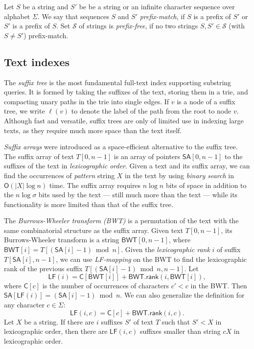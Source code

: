\documentclass[a4paper,UKenglish]{lipics-v2016}
\newcommand{\abs}[1]{\ensuremath{\lvert #1 \rvert}}
\newcommand{\Oh}[1]{\ensuremath{\mathsf{O}\!\left( #1 \right)}}
\newcommand{\rank}{\ensuremath{\mathsf{rank}}}
\newcommand{\LF}{\ensuremath{\mathsf{LF}}}
\newcommand{\LFmapping}{LF\nobreakdash-mapping}
\newcommand{\SA}{\ensuremath{\mathsf{SA}}}
\newcommand{\BWT}{\ensuremath{\mathsf{BWT}}}
\newcommand{\Carray}{\ensuremath{\mathsf{C}}}
\begin{document}
Let $S$ be a string and $S'$ be be a string or an infinite character sequence over alphabet $\Sigma$. We say that sequences $S$ and $S'$ \emph{prefix-match}, if $S$ is a prefix of $S'$ or $S'$ is a prefix of $S$. Set $\mathcal{S}$ of strings is \emph{prefix-free}, if no two strings $S, S' \in \mathcal{S}$ (with $S \ne S'$) prefix-match.

\subsection{Text indexes}

The \emph{suffix tree} \cite{Weiner1973} is the most fundamental full-text index supporting substring queries. It is formed by taking the suffixes of the text, storing them in a trie, and compacting unary paths in the trie into single edges. If $v$ is a node of a suffix tree, we write $\ell(v)$ to denote the label of the path from the root to node $v$. Although fast and versatile, suffix trees are only of limited use in indexing large texts, as they require much more space than the text itself.

\emph{Suffix arrays} \cite{Manber1993} were introduced as a space-efficient alternative to the suffix tree. The suffix array of text $T[0, n-1]$ is an array of pointers $\SA[0, n-1]$ to the suffixes of the text in \emph{lexicographic order}. Given a text and its suffix array, we can find the occurrences of \emph{pattern} string $X$ in the text by using \emph{binary search} in $\Oh{\abs{X} \log n}$ time. The suffix array requires $n \log n$ bits of space in addition to the $n \log \sigma$ bits used by the text --- still much more than the text --- while its functionality is more limited than that of the suffix tree.

The \emph{Burrows-Wheeler transform (BWT)} \cite{Burrows1994} is a permutation of the text with the same combinatorial structure as the suffix array. Given text $T[0, n-1]$, its Burrows-Wheeler transform is a string $\BWT[0, n-1]$, where $\BWT[i] = T[(\SA[i]-1) \bmod n]$. Given the \emph{lexicographic rank} $i$ of suffix $T[\SA[i], n-1]$, we can use \emph{\LFmapping} on the BWT to find the lexicographic rank of the previous suffix $T[(\SA[i]-1) \bmod n, n-1]$. Let
$$
\LF(i) = \Carray[\BWT[i]] + \BWT.\rank(i, \BWT[i]),
$$
where $\Carray[c]$ is the number of occurrences of characters $c' < c$ in the BWT. Then $\SA[\LF(i)] = (\SA[i]-1) \bmod n$. We can also generalize the definition for any character $c \in \Sigma$:
$$
\LF(i, c) = \Carray[c] + \BWT.\rank(i, c).
$$
Let $X$ be a string. If there are $i$ suffixes $S'$ of text $T$ such that $S' < X$ in lexicographic order, then there are $\LF(i, c)$ suffixes smaller than string $cX$ in lexicographic order.
\end{document}
